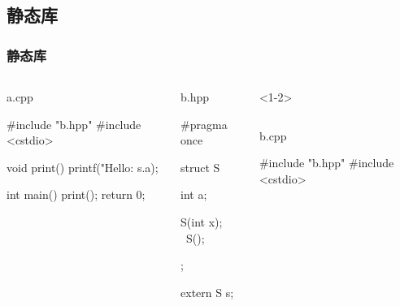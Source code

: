 \documentclass[UTF8,lualatex]{ctexbeamer}
\begin{document}

\subsection{静态库}

\begin{frame}[fragile,t]
    \frametitle{静态库}
    \scriptsize
    \begin{columns}[t]
        \begin{column}{0.33\textwidth}
            \begin{block}{a.cpp}
                \begin{cppcode}
                #include "b.hpp"
                #include <cstdio>

                void print() {
                  printf("Hello: %
                    s.a);
                }

                int main() {
                  print();
                  return 0;
                }
                \end{cppcode}
            \end{block}
        \end{column}
        \begin{column}{0.2\textwidth}
            \begin{block}{b.hpp}
                \begin{cppcode}
                #pragma once

                struct S
                {
                    int a;

                    S(int x);
                    ~S();
                };

                extern S s;
                \end{cppcode}
            \end{block}
        \end{column}
        \begin{onlyenv}<1-2>
            \begin{column}{0.33\textwidth}
                \begin{block}{b.cpp}
                    \begin{cppcode}
                    #include "b.hpp"
                    #include <cstdio>


\end{cppcode}
\end{block}
\end{column}
\end{onlyenv}
\end{columns}
\end{frame}
\end{document}
